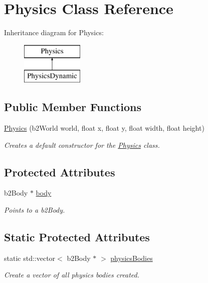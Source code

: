 \hypertarget{class_physics}{}\section{Physics Class Reference}
\label{class_physics}
Inheritance diagram for Physics\+:\begin{figure}[H]
\begin{center}
\leavevmode
\includegraphics[height=2.000000cm]{class_physics}
\end{center}
\end{figure}
\subsection*{Public Member Functions}
\begin{DoxyCompactItemize}
\item 
\hyperlink{class_physics_a0daeacfe7e8db67dde6d85c355fdbb7a}{Physics} (b2\+World world, float x, float y, float width, float height)
\begin{DoxyCompactList}\small\item\em Creates a default constructor for the \hyperlink{class_physics}{Physics} class. \end{DoxyCompactList}\end{DoxyCompactItemize}
\subsection*{Protected Attributes}
\begin{DoxyCompactItemize}
\item 
\mbox{\label{class_physics_a9ba278cda18f49ef2b18b0b293c7f666}} 
b2\+Body $\ast$ \hyperlink{class_physics_a9ba278cda18f49ef2b18b0b293c7f666}{body}
\begin{DoxyCompactList}\small\item\em Points to a b2\+Body. \end{DoxyCompactList}\end{DoxyCompactItemize}
\subsection*{Static Protected Attributes}
\begin{DoxyCompactItemize}
\item 
\mbox{\label{class_physics_a12f73191c1306ae4376d5934c83a4ae6}} 
static std\+::vector$<$ b2\+Body $\ast$ $>$ \hyperlink{class_physics_a12f73191c1306ae4376d5934c83a4ae6}{physics\+Bodies}
\begin{DoxyCompactList}\small\item\em Create a vector of all physics bodies created. \end{DoxyCompactList}\end{DoxyCompactItemize}


